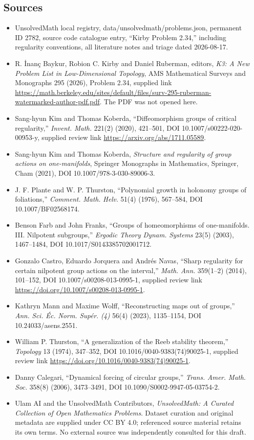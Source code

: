 \documentclass[11pt]{article}
\begin{document}
\subsection{Sources}
\begin{itemize}
\item UnsolvedMath local registry, data/unsolvedmath/problems.json, permanent ID 2782, source code catalogue entry, ``Kirby Problem 2.34,'' including regularity conventions, all literature notes and triage dated 2026-08-17.
\item R. İnanç Baykur, Robion C. Kirby and Daniel Ruberman, editors, \emph{K3: A New Problem List in Low-Dimensional Topology}, AMS Mathematical Surveys and Monographs 295 (2026), Problem 2.34, supplied link \url{https://math.berkeley.edu/sites/default/files/surv-295-ruberman-watermarked-author-pdf.pdf}. The PDF was not opened here.
\item [KK20] Sang-hyun Kim and Thomas Koberda, ``Diffeomorphism groups of critical regularity,'' \emph{Invent. Math.} 221(2) (2020), 421--501, DOI 10.1007/s00222-020-00953-y, supplied review link \url{https://arxiv.org/abs/1711.05589}.
\item [KK21] Sang-hyun Kim and Thomas Koberda, \emph{Structure and regularity of group actions on one-manifolds}, Springer Monographs in Mathematics, Springer, Cham (2021), DOI 10.1007/978-3-030-89006-3.
\item [PT76] J. F. Plante and W. P. Thurston, ``Polynomial growth in holonomy groups of foliations,'' \emph{Comment. Math. Helv.} 51(4) (1976), 567--584, DOI 10.1007/BF02568174.
\item [FF03] Benson Farb and John Franks, ``Groups of homeomorphisms of one-manifolds. III. Nilpotent subgroups,'' \emph{Ergodic Theory Dynam. Systems} 23(5) (2003), 1467--1484, DOI 10.1017/S0143385702001712.
\item [CJN14] Gonzalo Castro, Eduardo Jorquera and Andrés Navas, ``Sharp regularity for certain nilpotent group actions on the interval,'' \emph{Math. Ann.} 359(1--2) (2014), 101--152, DOI 10.1007/s00208-013-0995-1, supplied review link \url{https://doi.org/10.1007/s00208-013-0995-1}.
\item [MW23] Kathryn Mann and Maxime Wolff, ``Reconstructing maps out of groups,'' \emph{Ann. Sci. Éc. Norm. Supér. (4)} 56(4) (2023), 1135--1154, DOI 10.24033/asens.2551.
\item [Thu74b] William P. Thurston, ``A generalization of the Reeb stability theorem,'' \emph{Topology} 13 (1974), 347--352, DOI 10.1016/0040-9383(74)90025-1, supplied review link \url{https://doi.org/10.1016/0040-9383(74)90025-1}.
\item [Cal06a] Danny Calegari, ``Dynamical forcing of circular groups,'' \emph{Trans. Amer. Math. Soc.} 358(8) (2006), 3473--3491, DOI 10.1090/S0002-9947-05-03754-2.
\item Ulam AI and the UnsolvedMath Contributors, \emph{UnsolvedMath: A Curated Collection of Open Mathematics Problems}. Dataset curation and original metadata are supplied under CC BY 4.0; referenced source material retains its own terms. No external source was independently consulted for this draft.
\end{itemize}
\end{document}
